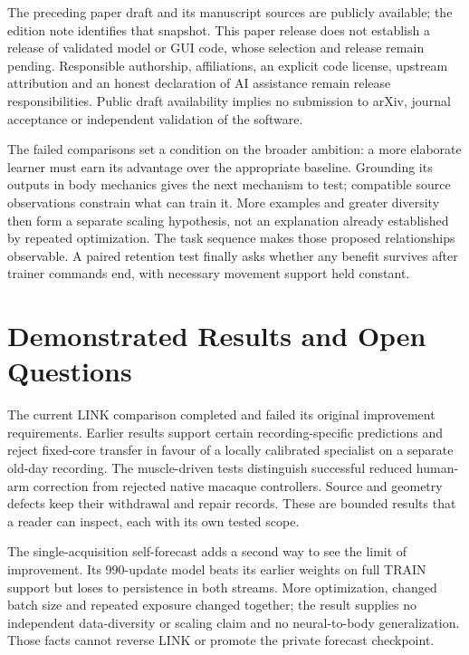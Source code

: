 The preceding paper draft and its manuscript sources are publicly available; the edition note identifies that snapshot. This paper release does not establish a release of validated model or GUI code, whose selection and release remain pending. Responsible authorship, affiliations, an explicit code license, upstream attribution and an honest declaration of AI assistance remain release responsibilities. Public draft availability implies no submission to arXiv, journal acceptance or independent validation of the software.

The failed comparisons set a condition on the broader ambition: a more elaborate learner must earn its advantage over the appropriate baseline. Grounding its outputs in body mechanics gives the next mechanism to test; compatible source observations constrain what can train it. More examples and greater diversity then form a separate scaling hypothesis, not an explanation already established by repeated optimization. The task sequence makes those proposed relationships observable. A paired retention test finally asks whether any benefit survives after trainer commands end, with necessary movement support held constant.






\section{Demonstrated Results and Open Questions}

The current LINK comparison completed and failed its original improvement
requirements. Earlier results support certain recording-specific predictions
and reject fixed-core transfer in favour of a locally calibrated specialist
on a separate old-day recording. The muscle-driven tests distinguish successful
reduced human-arm correction from rejected native macaque controllers. Source
and geometry defects keep their withdrawal and repair records. These are
bounded results that a reader can inspect, each with its own tested scope.

The single-acquisition self-forecast adds a second way to see the limit of improvement. Its 990-update model beats its earlier weights on full TRAIN support but loses to persistence in both streams. More optimization, changed batch size and repeated exposure changed together; the result supplies no independent data-diversity or scaling claim and no neural-to-body generalization. Those facts cannot reverse LINK or promote the private forecast checkpoint.

